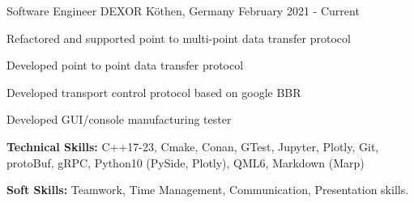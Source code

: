 

\begin{cventries}

  \cventry
    {Software Engineer} %
    {DEXOR} %
    {Köthen, Germany} %
    {February 2021 - Current} %
    {
      \begin{cvitems} %
        \item {Refactored and supported point to multi-point data transfer protocol}
        \item {Developed point to point data transfer protocol}
        \item {Developed transport control protocol based on google BBR}
        \item {Developed GUI/console manufacturing tester}
        \item {\textbf{Technical Skills:} C++17-23, Cmake, Conan, GTest, Jupyter, Plotly, Git, protoBuf, gRPC, Python10 (PySide, Plotly), QML6, Markdown (Marp)}
        \item {\textbf{Soft Skills:} Teamwork, Time Management, Communication, Presentation skills.}
      \end{cvitems}
    }


\end{cventries}
